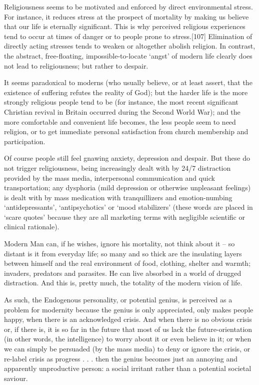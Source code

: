 \documentclass[
]{book}
\begin{document}
Religiousness seems to be motivated and enforced by direct environmental stress. For instance, it reduces stress at the prospect of mortality by making us believe that our life is eternally significant. This is why perceived religious experiences tend to occur at times of danger or to people prone to stress.{[}107{]} Elimination of directly acting stresses tends to weaken or altogether abolish religion. In contrast, the abstract, free-floating, impossible-to-locate `angst' of modern life clearly does not lead to religiousness; but rather to despair.

It seems paradoxical to moderns (who usually believe, or at least assert, that the existence of suffering refutes the reality of God); but the harder life is the more strongly religious people tend to be (for instance, the most recent significant Christian revival in Britain occurred during the Second World War); and the more comfortable and convenient life becomes, the less people seem to need religion, or to get immediate personal satisfaction from church membership and participation.

Of course people still feel gnawing anxiety, depression and despair. But these do not trigger religiousness, being increasingly dealt with by 24/7 distraction provided by the mass media, interpersonal communication and quick transportation; any dysphoria (mild depression or otherwise unpleasant feelings) is dealt with by mass medication with tranquillizers and emotion-numbing `antidepressants', `antipsychotics' or `mood stabilizers' (these words are placed in `scare quotes' because they are all marketing terms with negligible scientific or clinical rationale).

Modern Man can, if he wishes, ignore his mortality, not think about it -- so distant is it from everyday life; so many and so thick are the insulating layers between himself and the real environment of food, clothing, shelter and warmth; invaders, predators and parasites. He can live absorbed in a world of drugged distraction. And this is, pretty much, the totality of the modern vision of life.

As such, the Endogenous personality, or potential genius, is perceived as a problem for modernity because the genius is only appreciated, only makes people happy, when there is an acknowledged crisis. And when there is no obvious crisis or, if there is, it is so far in the future that most of us lack the future-orientation (in other words, the intelligence) to worry about it or even believe in it; or when we can simply be persuaded (by the mass media) to deny or ignore the crisis, or re-label crisis as progress . . . then the genius becomes just an annoying and apparently unproductive person: a social irritant rather than a potential societal saviour.
\end{document}
